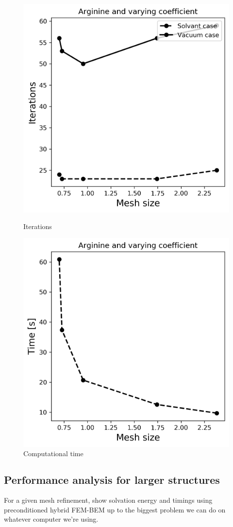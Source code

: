 \begin{figure}[!htb]
  \includegraphics[width=\linewidth]{Hybrid_FEM_BEM_Arginine_varying_coeff_iter.png}
  \caption{Iterations}
\endminipage\hfill
{}%
  \includegraphics[width=\linewidth]{Hybrid_FEM_BEM_Arginine_varying_coeff_time.png}
  \caption{Computational time}
\endminipage
\end{figure}

\subsection*{\sffamily \large Performance analysis for larger structures}

For a given mesh refinement, show solvation energy and timings using preconditioned hybrid FEM-BEM up to the biggest problem we can do on whatever computer we're using.
